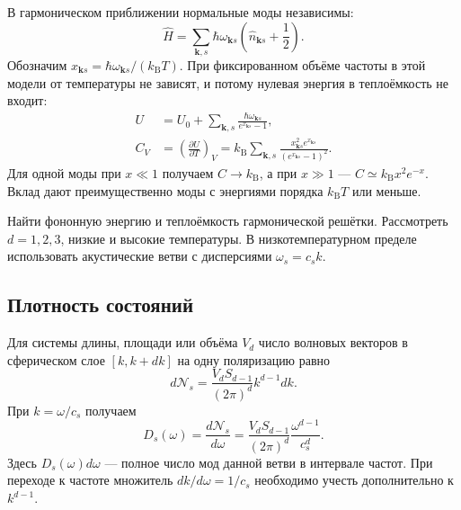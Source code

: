 \documentclass[../final.tex]{subfiles}
\begin{document}
\captionsetup{font=footnotesize,labelfont=bf,skip=5pt}


В гармоническом приближении нормальные моды независимы:
\[
    \hat H=\sum_{\boldsymbol k,s}\hbar\omega_{\boldsymbol k s}
       \left(\hat n_{\boldsymbol k s}+\frac12\right).
\]
Обозначим $x_{\boldsymbol k s}=\hbar\omega_{\boldsymbol k s}/(k_{\mathrm B}T)$.
При фиксированном объёме частоты в этой модели от температуры не зависят,
и потому нулевая энергия в теплоёмкость не входит:
\begin{align*}
    U&=U_0+\sum_{\boldsymbol k,s}
       \frac{\hbar\omega_{\boldsymbol k s}}{e^{x_{\boldsymbol k s}}-1},\\
    C_V&=\left(\frac{\partial U}{\partial T}\right)_V
       =k_{\mathrm B}\sum_{\boldsymbol k,s}
          \frac{x_{\boldsymbol k s}^2e^{x_{\boldsymbol k s}}}
               {(e^{x_{\boldsymbol k s}}-1)^2}.
\end{align*}
Для одной моды при $x\ll1$ получаем $C\to k_{\mathrm B}$,
а при $x\gg1$ --- $C\simeq k_{\mathrm B}x^2e^{-x}$.
Вклад дают преимущественно моды с энергиями порядка $k_{\mathrm B}T$
или меньше.

\begingroup
\renewcommand{\thesection}{4.\arabic{section}}
\label{task:fksv_debye}

\condition
Найти фононную энергию и теплоёмкость гармонической решётки.
Рассмотреть $d=1,2,3$, низкие и высокие температуры.
В низкотемпературном пределе использовать акустические ветви
с дисперсиями $\omega_s=c_sk$.

\solution

\subsection*{Плотность состояний}

Для системы длины, площади или объёма $V_d$ число волновых векторов
в сферическом слое $[k,k+dk]$ на одну поляризацию равно
\[
    d\mathcal N_s=\frac{V_d S_{d-1}}{(2\pi)^d}k^{d-1}dk.
\]
При $k=\omega/c_s$ получаем
\[
    D_s(\omega)=\frac{d\mathcal N_s}{d\omega}
       =\frac{V_d S_{d-1}}{(2\pi)^d}
          \frac{\omega^{d-1}}{c_s^d}.
\]
Здесь $D_s(\omega)d\omega$ --- полное число мод данной ветви
в интервале частот. При переходе к частоте множитель
$dk/d\omega=1/c_s$ необходимо учесть дополнительно к $k^{d-1}$.
\end{document}
